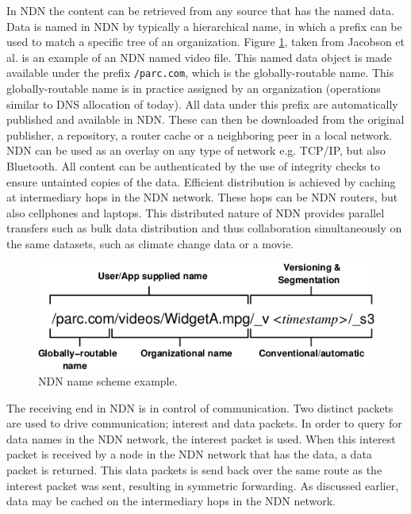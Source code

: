 In NDN the content can be retrieved from any source that has the named data. Data is named in NDN by typically a hierarchical name, in which a prefix can be used to match a specific tree of an organization.  Figure \ref{fig:ndn_name}, taken from Jacobson et al. \cite{jacobson2009networking} is an example of an NDN named video file. This named data object is made available under the prefix \texttt{/parc.com}, which is the globally-routable name. This globally-routable name is in practice assigned by an organization (operations similar to DNS allocation of today). All data under this prefix are automatically published and available in NDN. These can then be downloaded from the original publisher, a repository, a router cache or a neighboring peer in a local network. NDN can be used as an overlay on any type of network e.g. TCP/IP, but also Bluetooth. All content can be authenticated by the use of integrity checks to ensure untainted copies of the data. Efficient distribution is achieved by caching at intermediary hops in the NDN network. These hops can be NDN routers, but also cellphones and laptops. This distributed nature of NDN provides parallel transfers such as bulk data distribution and thus collaboration simultaneously on the same datasets, such as climate change data or a movie.

\begin{figure}[H]
\centering
\includegraphics[width=\columnwidth/2]{Images/ndn_name.png}
\caption{NDN name scheme example.}
\label{fig:ndn_name}
\end{figure}

The receiving end in NDN is in control of communication. Two distinct packets are used to drive communication; interest and data packets. In order to query for data names in the NDN network, the interest packet is used. When this interest packet is received by a node in the NDN network that has the data, a data packet is returned. This data packets is send back over the same route as the interest packet was sent, resulting in symmetric forwarding. As discussed earlier, data may be cached on the intermediary hops in the NDN network.

